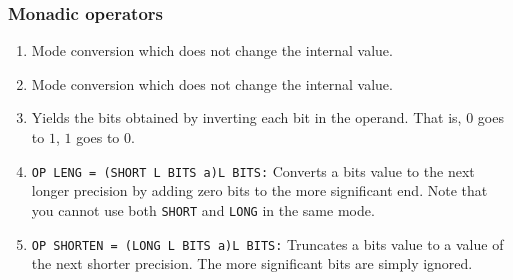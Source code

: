 \subsubsection*{Monadic operators}
\begin{enumerate}
\item {} \newline
Mode conversion which does not change the internal value.
\item {} \newline
Mode conversion which does not change the internal value.
\item {} \newline
Yields the bits obtained by inverting each bit in the operand. That is,
$0$ goes to $1$, $1$ goes to $0$.
\item {} \newline
\verb|OP LENG = (SHORT L BITS a)L BITS:| \newline
Converts a bits value to the next longer precision by adding zero bits
to the more significant end. Note that you cannot use both \verb|SHORT|
and \verb|LONG| in the same mode.
\item {} \newline
\verb|OP SHORTEN = (LONG L BITS a)L BITS:|\newline
Truncates a bits value to a value of the next shorter precision. The
more significant bits are simply ignored.
\end{enumerate}

